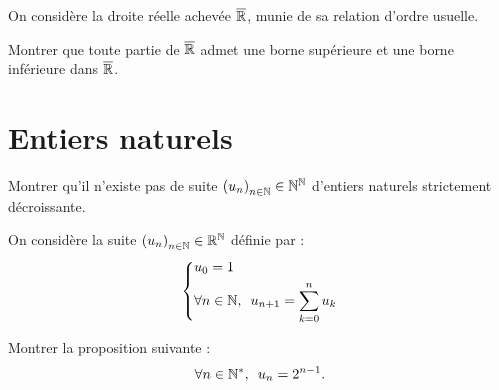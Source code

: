 \begin{corr}
\end{corr}

\begin{exo}
On considère la droite réelle achevée \(\overline{\mathbb{R}}\), munie de sa relation d'ordre usuelle.

Montrer que toute partie de \(\overline{\mathbb{R}}\) admet une borne supérieure et une borne inférieure dans \(\overline{\mathbb{R}}\).
\end{exo}

\begin{corr}
\end{corr}

\section{Entiers naturels}

\begin{exo}
Montrer qu'il n'existe pas de suite \(\left(u_n\right)_{n\in\mathbb{N}}\in\mathbb{N}^{\mathbb{N}}\) d'entiers naturels strictement décroissante.
\end{exo}

\begin{corr}
\end{corr}

\begin{exo}
On considère la suite \(\left(u_n\right)_{n\in\mathbb{N}}\in\mathbb{R}^{\mathbb{N}}\) définie par : \[\begin{dcases}u_0=1 \\ \quantifs{\forall n\in\N}u_{n+1}=\sum_{k=0}^{n}u_k\end{dcases}\]

Montrer la proposition suivante : \[\quantifs{\forall n\in\Ns}u_n=2^{n-1}.\]
\end{exo}

\begin{corr}
\end{corr}